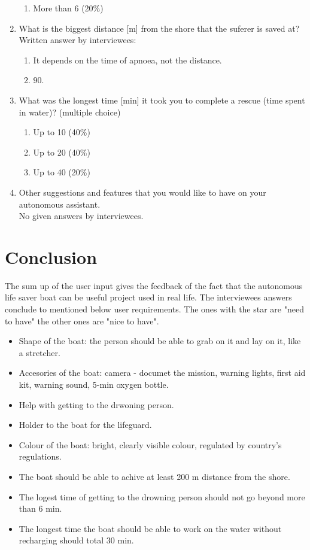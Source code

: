 \documentclass{article}[10pt]
\begin{document}
\begin{enumerate}
\begin{enumerate}
        \item   More than 6 (20\%)
    \end{enumerate}
    \item What is the biggest distance [m] from the shore that the suferer is saved at?\\
            Written answer by interviewees:
            \begin{enumerate}
                \item It depends on the time of apnoea, not the distance.
                \item 90.
            \end{enumerate} 
    \item What was the longest time [min] it took you to complete a rescue (time spent in water)? (multiple choice)
    \begin{enumerate}
        \item  Up to 10 (40\%)
        \item  Up to 20 (40\%)
        \item  Up to 40 (20\%)
    \end{enumerate}
    \item Other suggestions and features that you would like to have on your autonomous assistant.\\
           No given answers by interviewees.     
\end{enumerate}

\section*{Conclusion}
The sum up of the user input gives the feedback of the fact that the autonomous life saver boat can be useful project used in real life. The interviewees answers conclude to mentioned below user requirements. The ones with the star are "need to have" the other ones are "nice to have".
\begin{itemize}
     \item Shape of the boat: the person should be able to grab on it and lay on it, like a stretcher.
     \item Accesories of the boat: camera - documet the mission, warning lights, first aid kit, warning sound, 5-min oxygen bottle.
     \item Help with getting to the drwoning person.
     \item Holder to the boat for the lifeguard.
     \item Colour of the boat: bright, clearly visible colour, regulated by country's regulations.
     \item The boat should be able to achive at least 200 m distance from the shore.
     \item The logest time of getting to the drowning person should not go beyond more than 6 min.
     \item The longest time the boat should be able to work on the water without recharging should total 30 min.
\end{itemize}
\end{document}
